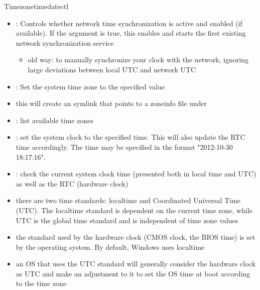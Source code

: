 \begin{frame}{Timezone}{timedatectl\vspace{0.5cm}}
  \begin{itemize}
    \item {}: Controls whether network time synchronization is active and enabled (if available). If the argument is true, this enables and starts the first existing network synchronization service
      \begin{Sidenote}
        \begin{itemize}
          \item \alert{old way:}  to manually synchronize your clock with the network, ignoring large deviations between local UTC and network UTC
        \end{itemize}
      \end{Sidenote}
    \item  {}: Set the system time zone to the specified value
      \item this will create an  symlink that points to a zoneinfo file under 
    \item {}: list available time zones
    \item {}: set the system clock to the specified time. This will also update the RTC time accordingly. The time may be specified in the format "2012-10-30 18:17:16".
    \item {}: check the current \alert{system clock} time (presented both in local time and UTC) as well as the RTC (\alert{hardware clock})
    \item there are two time standards: localtime and Coordinated Universal Time (UTC). The localtime standard is dependent on the current time zone, while UTC is the global time standard and is independent of time zone values
    \item the standard used by the hardware clock (CMOS clock, the BIOS time) is set by the operating system. By default, Windows uses localtime
    \item an OS that uses the UTC standard will generally consider the hardware clock as UTC and make an adjustment to it to set the OS time at boot according to the time zone
  \end{itemize}
\end{frame}

